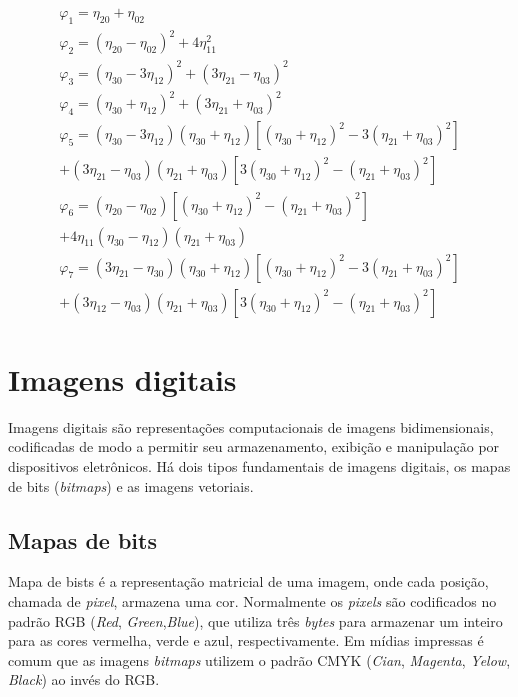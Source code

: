 \begin{subequations}\label{eq:mmt}
\begin{align}
  \varphi_1 = \eta_{20} + \eta_{02} \\
  \varphi_2 = (\eta_{20} - \eta_{02})^2 + 4\eta_{11}^2 \\
  \varphi_3 = (\eta_{30} - 3\eta_{12})^2 + (3\eta_{21} - \eta_{03})^2 \\
  \varphi_4 = (\eta_{30} + \eta_{12})^2 + (3\eta_{21} + \eta_{03})^2 \\
%
  \varphi_5 = (\eta_{30} - 3\eta_{12})(\eta_{30} + \eta_{12})
               \left[ (\eta_{30} + \eta_{12})^2 - 3(\eta_{21} + \eta_{03})^2 \right] \\
              + (3\eta_{21} - \eta_{03})(\eta_{21} + \eta_{03})
               \left[ 3(\eta_{30} + \eta_{12})^2 - (\eta_{21} + \eta_{03})^2 \right] \\
%
  \varphi_6 = (\eta_{20} - \eta_{02})
               \left[ (\eta_{30} + \eta_{12})^2 - (\eta_{21} + \eta_{03})^2 \right] \\
              + 4\eta_{11}(\eta_{30} - \eta_{12})(\eta_{21} + \eta_{03}) \\
%
  \varphi_7 = (3\eta_{21} - \eta_{30})(\eta_{30} + \eta_{12})
               \left[ (\eta_{30} + \eta_{12})^2 - 3(\eta_{21} + \eta_{03})^2 \right] \\
              + (3\eta_{12} - \eta_{03})(\eta_{21} + \eta_{03})
               \left[ 3(\eta_{30} + \eta_{12})^2 - (\eta_{21} + \eta_{03})^2 \right]
\end{align}
\end{subequations}

\section{Imagens digitais}\label{sec:img_dig}

Imagens digitais são representações computacionais de imagens bidimensionais,
codificadas de modo a permitir seu armazenamento, exibição e manipulação por
dispositivos eletrônicos. Há dois tipos fundamentais de imagens digitais,
os mapas de bits (\textit{bitmaps}) e as imagens vetoriais.

\subsection{Mapas de bits}

Mapa de bists é a representação matricial de uma imagem, onde cada posição,
chamada de \textit{pixel}, armazena uma cor. Normalmente os \textit{pixels} são
codificados no padrão RGB (\textit{Red}, \textit{Green},\textit{Blue}), que
utiliza três \textit{bytes} para armazenar um inteiro para as cores vermelha,
verde e azul, respectivamente. Em mídias impressas é comum que as imagens
\textit{bitmaps} utilizem o padrão
CMYK (\textit{Cian}, \textit{Magenta}, \textit{Yelow}, \textit{Black}) ao invés
do RGB.

